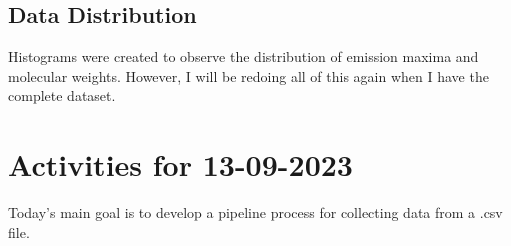\documentclass{article}
\begin{document}
\subsection*{Data Distribution}
Histograms were created to observe the distribution of emission maxima and molecular weights. However, I will be redoing all of this again when I have the complete dataset.

\section*{Activities for 13-09-2023}
Today's main goal is to develop a pipeline process for collecting data from a .csv file.
\end{document}

